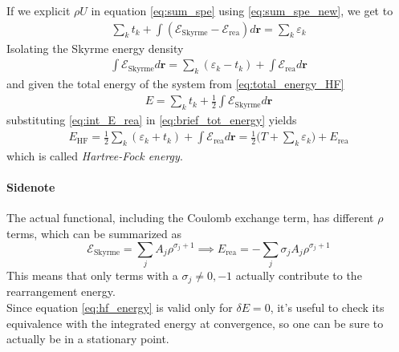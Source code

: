 If we explicit $\rho U$ in equation \eqref{eq:sum_spe} using \eqref{eq:sum_spe_new}, we get to
\begin{align*}
    \sum_k t_k + \int (\mathcal E_\text{Skyrme}-\mathcal E_\text{rea}) d\bm r = \sum_k \varepsilon_k 
\end{align*}
Isolating the Skyrme energy density
\begin{align}
    \label{eq:int_E_rea}
    \int \mathcal E_\text{Skyrme} d\bm r = \sum_k (\varepsilon_k -t_k) + \int \mathcal E_\text{rea} d\bm r
\end{align}
and given the total energy of the system from \eqref{eq:total_energy_HF}
\begin{align}
    \label{eq:brief_tot_energy}
E=\sum_k t_k + \frac 1 2 \int \mathcal E_\text{Skyrme} d\bm r 
\end{align}
substituting \eqref{eq:int_E_rea} in \eqref{eq:brief_tot_energy} yields
\begin{align}
    \label{eq:hf_energy}
E_\text{HF} = \frac 1 2 \sum_k (\varepsilon_k + t_k) +\int \mathcal E_\text{rea} d\bm r = \frac 1 2 \bigg(T+\sum_k\varepsilon_k\bigg) +E_\text{rea}
\end{align}
which is called \textit{Hartree-Fock energy}.
\paragraph{Sidenote}
The actual functional, including the Coulomb exchange term, has different $\rho$ terms, which can be summarized as
\begin{equation*}
    \mathcal E_\text{Skyrme} = \sum_j A_j \rho^{\sigma_j+1} \implies E_\text{rea} = -\sum_j \sigma_j A_j \rho^{\sigma_j+1} 
\end{equation*}
This means that only terms with a $\sigma_j\neq 0, -1$ actually contribute to the rearrangement energy.
\\Since equation \eqref{eq:hf_energy} is valid only for $\delta E = 0$, it's useful to check its equivalence with the integrated energy at convergence, so one can be sure to actually be in a stationary point.